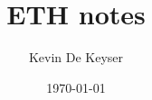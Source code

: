 \documentclass[a3paper,twoside]{article} %
\begin{document}

\title{ETH notes}
\date{\today}
\author{Kevin De Keyser}

\maketitle
{}
\newpage
\tableofcontents
\newpage
\raggedbottom


%
%
%

%
%
\end{document}
